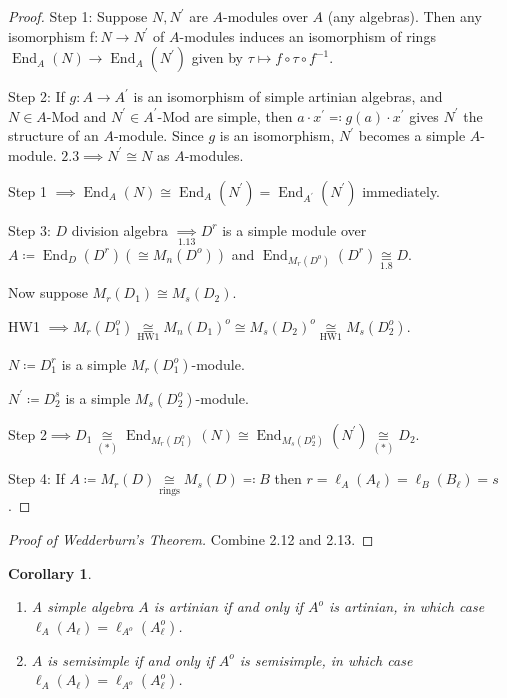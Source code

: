 \documentclass{article}
\theoremstyle{definition}
\theoremstyle{plain}
\newtheorem{corollary}[theorem]{Corollary}
\theoremstyle{remark}
\begin{document}
    \begin{proof}
        Step 1: Suppose \(N, N^{\prime}\) are \(A\)-modules over \(A\) (any algebras). Then any isomorphism f\(: N \to N^{\prime}\) of \(A\)-modules induces an isomorphism of rings \(\operatorname{End}_A(N) \to \operatorname{End}_A(N^{\prime})\) given by \(\tau \mapsto f \circ \tau \circ f ^{-1}\).

        Step 2: If \(g: A \to A^{\prime}\) is an isomorphism of simple artinian algebras, and \(N\in A\text{-Mod}\) and \(N^{\prime} \in A^{\prime}\text{-Mod}\) are simple, then \(a \cdot x^{\prime} \eqqcolon g(a) \cdot x^{\prime}\) gives \(N^{\prime}\) the structure of an \(A\)-module. Since \(g\) is an isomorphism, \(N^{\prime}\) becomes a simple \(A\)-module. \(2.3 \implies N^{\prime} \cong N\) as \(A\)-modules. 

        Step 1 \(\implies \operatorname{End}_A(N) \cong \operatorname{End}_A(N^{\prime}) = \operatorname{End}_{A^{\prime}}(N^{\prime})\) immediately.

        Step 3: \(D\) division algebra \(\underset{1.13}{\implies} D^r\) is a simple module over \(A\coloneqq \operatorname{End}_D(D^r) (\cong M_n(D^o))\) and \(\operatorname{End}_{M_r(D^o)}(D^r) \underset{1.8}{\cong} D\).

        Now suppose \(M_r(D_1) \cong M_s(D_2)\).

        HW1 \(\implies M_r(D_1^o) \underset{\text{HW1}}{\cong} M_n(D_1)^o \cong M_s(D_2)^o \underset{\text{HW1}}{\cong} M_s(D_2^o)\).
        
        \(N \coloneqq D_1^r\) is a simple \(M_r(D_1^o)\)-module.

        \(N^{\prime} \coloneqq D_2^s\) is a simple \(M_s(D_2^o)\)-module.

        Step 2\(\implies D_1 \underset{(\ast)}{\cong} \operatorname{End}_{M_r(D_1^o)} (N) \cong \operatorname{End}_{M_s(D_2^o)}(N^{\prime}) \underset{(\ast)}{\cong} D_2 \).

        Step 4: If \(A \coloneqq M_r(D) \underset{\text{rings}}{\cong} M_s(D) \eqqcolon B\) then \(r = \ell_A(A_\ell) = \ell_B(B_\ell) = s\). 
    \end{proof}

    \begin{proof}
        [Proof of Wedderburn's Theorem] Combine 2.12 and 2.13.
    \end{proof}

    \begin{corollary}
        \begin{enumerate}[label=\roman*)]
            \item A simple algebra \(A\) is artinian if and only if \(A^o\) is artinian, in which case \(\ell_A(A_\ell) = \ell_{A^o}(A_\ell^o)\).
            \item \(A\) is semisimple if and only if \(A^o\) is semisimple, in which case \(\ell_A(A_\ell) = \ell_{A^o}(A^o_\ell)\). 
        \end{enumerate} 
    \end{corollary}
\end{document}
